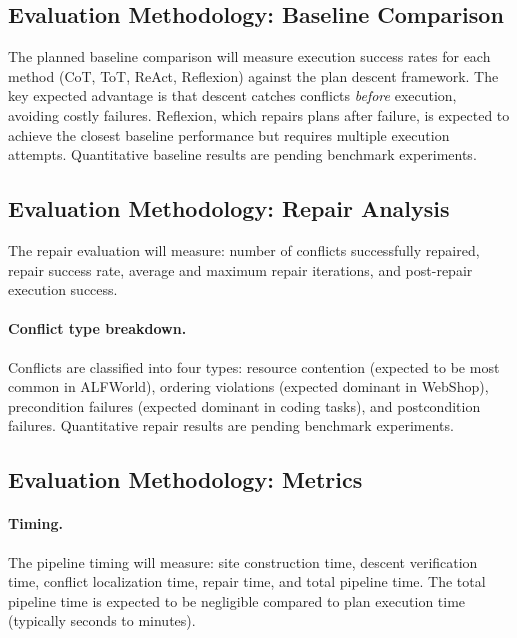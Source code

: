 \documentclass[11pt]{article}
\begin{document}
\subsection{Evaluation Methodology: Baseline Comparison}\label{ssec:baselines}

The planned baseline comparison will measure execution success rates for
each method (CoT, ToT, ReAct, Reflexion) against the plan descent
framework.  The key expected advantage is that descent catches conflicts
\emph{before} execution, avoiding costly failures.  Reflexion, which
repairs plans after failure, is expected to achieve the closest baseline
performance but requires multiple execution attempts.
Quantitative baseline results are pending benchmark experiments.

\subsection{Evaluation Methodology: Repair Analysis}\label{ssec:repair-analysis}

The repair evaluation will measure: number of conflicts successfully
repaired, repair success rate, average and maximum repair iterations,
and post-repair execution success.

\paragraph{Conflict type breakdown.}
Conflicts are classified into four types: resource contention (expected
to be most common in ALFWorld), ordering violations (expected dominant
in WebShop), precondition failures (expected dominant in coding tasks),
and postcondition failures.  Quantitative repair results are pending
benchmark experiments.

\subsection{Evaluation Methodology: Metrics}\label{ssec:metrics}

\paragraph{Timing.}
The pipeline timing will measure: site construction time, descent
verification time, conflict localization time, repair time, and total
pipeline time.  The total pipeline time is expected to be negligible
compared to plan execution time (typically seconds to minutes).
\end{document}
